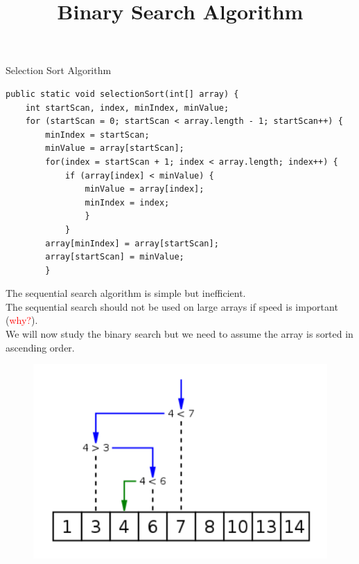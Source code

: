 \documentclass[11pt]{beamer}
\newcommand{\red}[1]{\textcolor{red}{#1}}
\begin{document}
\begin{frame}[fragile]
{Selection Sort Algorithm}
    \begin{lstlisting}[basicstyle=\ttfamily\footnotesize]
public static void selectionSort(int[] array) {
    int startScan, index, minIndex, minValue;
    for (startScan = 0; startScan < array.length - 1; startScan++) {
        minIndex = startScan;
        minValue = array[startScan];
        for(index = startScan + 1; index < array.length; index++) {
            if (array[index] < minValue) {
                minValue = array[index];
                minIndex = index; 
                }
            }
        array[minIndex] = array[startScan];
        array[startScan] = minValue;
        }
    \end{lstlisting}
\end{frame}

\begin{frame}[fragile]
\title{Binary Search Algorithm}
    The sequential search algorithm is simple but inefficient. \\ \vspace{1em}
    The sequential search should not be used on large arrays if speed is important (\red{why?}). \\ \vspace{1em}
    We will now study the binary search but we need to assume the array is sorted in ascending order.
    \noindent 
    \begin{figure}[H]
    \centering
    \includegraphics[scale=0.6]{Images/chapter07_section11_BinarySearch01.png}
    \end{figure}
\end{frame}
\end{document}
